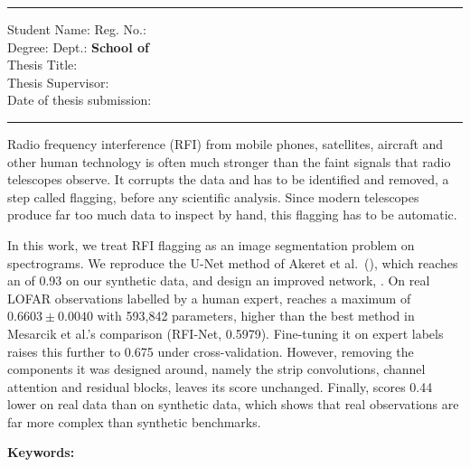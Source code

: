 \begin{flushleft} %
    \setlength{\parskip}{0pt}
    { \par}
    \medskip
    \vspace{6pt}
    \hrule \vspace{0.4cm}
		  Student Name:	 \textbf{\ThesisAuthor}	\hfill Reg. No.: \textbf{\RegNumber} \\
		Degree:  \textbf{\DegreeDisplay} \hfill Dept.:  \textbf{School of \Department} \: \textbf{\ThesisTitle}\\
		Thesis Supervisor:  \textbf{\ProjectSupervisor}\\
		Date of thesis submission: \textbf{{ \SubmissionDate}\\[0.4cm] }
	\hrule \vspace{1.5cm} 
\end{flushleft}
\noindent
Radio frequency interference (RFI) from mobile phones, satellites, aircraft and
other human technology is often much stronger than the faint signals that radio
telescopes observe. It corrupts the data and has to be identified and removed,
a step called flagging, before any scientific analysis. Since modern telescopes
produce far too much data to inspect by hand, this flagging has to be automatic.

In this work, we treat RFI flagging as an image segmentation problem on
spectrograms. We reproduce the U-Net method of Akeret et al.\ (\tfunet{}), which
reaches an \Fone{} of 0.93 on our synthetic data, and design an improved
network, \hybrid{}. On real LOFAR observations labelled by a human expert,
\hybrid{} reaches a maximum \Fone{} of $0.6603 \pm 0.0040$ with 593{,}842
parameters, higher than the best method in Mesarcik et al.'s comparison
(RFI-Net, 0.5979). Fine-tuning it on
expert labels raises this further to 0.675 under cross-validation. However,
removing the components it was designed around, namely the strip convolutions,
channel attention and residual blocks, leaves its score unchanged. Finally,
\tfunet{} scores 0.44 lower on real data than on synthetic data, which shows
that real observations are far more complex than synthetic benchmarks.

\vspace{1.2cm}

{\large \textbf{Keywords: }}\par{\Large \ThesisKeywords}

\cleardoublepage
